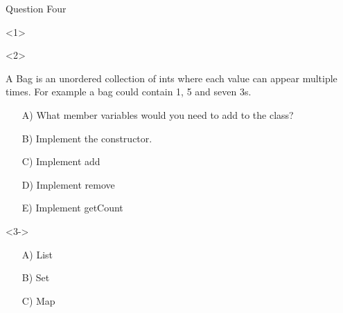 \documentclass[12]{beamer}
\begin{document}
\begin{frame}[t, fragile]{Question Four} \vspace{4pt}

\begin{onlyenv}<1>
\end{onlyenv}


\begin{onlyenv}<2>

A Bag is an unordered collection of ints where each value can appear multiple times.
For example a bag could contain 1, 5 and seven 3s.
\begin{itemize}
\item[A)] What member variables would you need to add to the class?
\item[B)] Implement the constructor.
\item[C)] Implement add
\item[D)] Implement remove
\item[E)] Implement getCount
\end{itemize}
\end{onlyenv}

\begin{onlyenv}<3->
\begin{itemize}
\item[A)] List

\item[B)] Set

\item[C)] Map
\end{itemize}
\end{onlyenv}

\end{frame}
\end{document}
